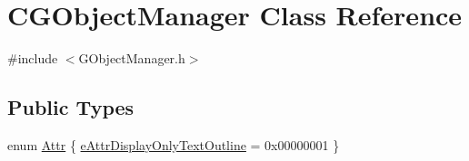 \hypertarget{class_c_g_object_manager}{}\section{C\+G\+Object\+Manager Class Reference}
\label{class_c_g_object_manager}


{\ttfamily \#include $<$G\+Object\+Manager.\+h$>$}

\subsection*{Public Types}
\begin{DoxyCompactItemize}
\item 
enum \hyperlink{class_c_g_object_manager_aae1239b4b634d4ae811f873284504553}{Attr} \{ \hyperlink{class_c_g_object_manager_aae1239b4b634d4ae811f873284504553a358161e50130f826052028e4ec8da50e}{e\+Attr\+Display\+Only\+Text\+Outline} = 0x00000001
 \}
\end{DoxyCompactItemize}
